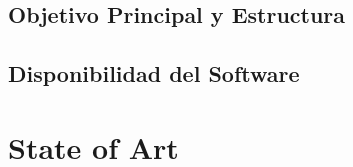 \documentclass[a4paper, 12pt, english]{book}
\begin{document}



\section{Objetivo Principal y Estructura}
\label{sec:objetivo}






\section{Disponibilidad del Software}
\label{sec:objetivo}



\cleardoublepage %
\chapter{State of Art} %
\label{chap:state-of-art} %
\end{document}
